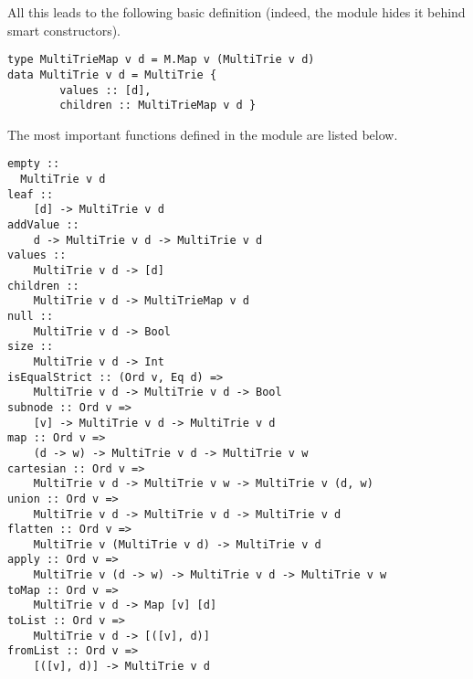 \documentclass{article}
\theoremstyle{definition}
\begin{document}
All this leads to the following basic definition (indeed, the module hides it
behind smart constructors).

\begin{lstlisting}
type MultiTrieMap v d = M.Map v (MultiTrie v d) 
data MultiTrie v d = MultiTrie {
        values :: [d],
        children :: MultiTrieMap v d }
\end{lstlisting}

The most important functions defined in the module are listed below.

\begin{lstlisting}
empty ::
  MultiTrie v d
leaf ::
    [d] -> MultiTrie v d
addValue ::
    d -> MultiTrie v d -> MultiTrie v d
values ::
    MultiTrie v d -> [d]
children ::
    MultiTrie v d -> MultiTrieMap v d
null ::
    MultiTrie v d -> Bool
size ::
    MultiTrie v d -> Int
isEqualStrict :: (Ord v, Eq d) =>
    MultiTrie v d -> MultiTrie v d -> Bool
subnode :: Ord v =>
    [v] -> MultiTrie v d -> MultiTrie v d
map :: Ord v =>
    (d -> w) -> MultiTrie v d -> MultiTrie v w
cartesian :: Ord v =>
    MultiTrie v d -> MultiTrie v w -> MultiTrie v (d, w)
union :: Ord v =>
    MultiTrie v d -> MultiTrie v d -> MultiTrie v d
flatten :: Ord v =>
    MultiTrie v (MultiTrie v d) -> MultiTrie v d
apply :: Ord v =>
    MultiTrie v (d -> w) -> MultiTrie v d -> MultiTrie v w
toMap :: Ord v =>
    MultiTrie v d -> Map [v] [d]
toList :: Ord v =>
    MultiTrie v d -> [([v], d)]
fromList :: Ord v =>
    [([v], d)] -> MultiTrie v d
\end{lstlisting}
\end{document}
